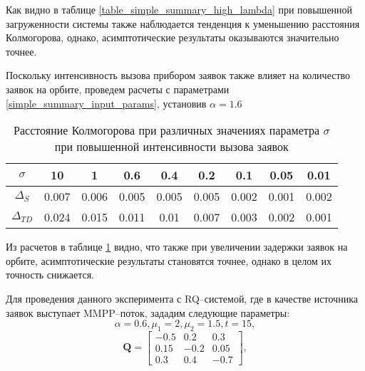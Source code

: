 Как видно в таблице \ref{table_simple_summary_high_lambda}  при повышенной загруженности системы также наблюдается тенденция к уменьшению расстояния Колмогорова, однако, асимптотические результаты оказываются значительно точнее.

Поскольку интенсивность вызова прибором заявок также влияет на количество заявок на орбите, проведем расчеты с параметрами \eqref{simple_summary_input_params}, установив $\alpha = 1.6$

\begin{table}[h!] 
	\centering
	\caption{Расстояние Колмогорова при различных значениях параметра $\sigma$ при повышенной интенсивности вызова заявок}
	\label{table_simple_summary_high_alpha}
	\begin{tabular}{| c | c | c | c | c | c | c | c | c |}
		\hline
		$\sigma$ & 10 & 1 & 0.6 & 0.4 & 0.2 & 0.1 & 0.05 & 0.01 \\ 
		\hline
		$\Delta_S$ & 0.007 & 0.006 & 0.005 & 0.005 & 0.005 & 0.002 & 0.001 & 0.002\\
		\hline
		$\Delta_{TD}$ & 0.024 & 0.015 & 0.011 & 0.01 & 0.007 & 0.003 & 0.002 & 0.001\\
		\hline
	\end{tabular}
\end{table}

Из расчетов в таблице \ref{table_simple_summary_high_alpha} видно, что также при увеличении задержки заявок на орбите, асимптотические результаты становятся точнее, однако в целом их точность снижается.

Для проведения данного эксперимента с RQ--системой, где в качестве источника заявок выступает MMPP--поток, зададим следующие параметры:
\begin{equation*} \label{map_summary_input_params}
	\alpha = 0.6,
	\mu_{1} = 2,
	\mu_{2} = 1.5, 
	t = 15,
\end{equation*}
 \begin{equation*}
 	\boldsymbol{Q}=\begin{bmatrix}
 		-0.5 &  0.2 &  0.3\\
 		0.15 & -0.2 &  0.05\\
 		0.3 &  0.4 &  -0.7
 	\end{bmatrix},
 \end{equation*}
 
